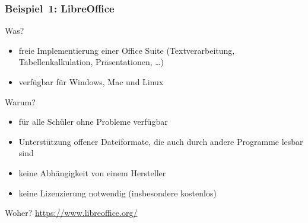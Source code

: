 \documentclass{beamer}
\begin{document}
\begin{frame}
  \frametitle{Beispiel~1: LibreOffice}

  \onslide<+->
  \begin{block}{Was?}
    \begin{itemize}
    \item freie Implementierung einer Office Suite (Textverarbeitung,
      Tabellenkalkulation, Präsentationen, \dots)
    \item verfügbar für Windows, Mac und Linux
    \end{itemize}
  \end{block}

  \onslide<+->
  \begin{block}{Warum?}
    \begin{itemize}
    \item für alle Schüler ohne Probleme verfügbar
    \item Unterstützung offener Dateiformate, die auch durch andere Programme
      lesbar sind
    \item keine Abhängigkeit von einem Hersteller
    \item keine Lizenzierung notwendig (insbesondere kostenlos)
    \end{itemize}
  \end{block}

  \onslide<+->

  \begin{block}{Woher?}
    \url{https://www.libreoffice.org/}
  \end{block}


\end{frame}
\end{document}

